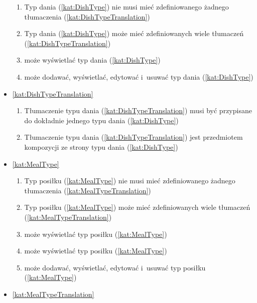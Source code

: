 \begin{itemize}[label={\textbf{Reguły dla}}, wide, labelwidth=!, labelindent=0pt]
\begin{enumerate}[label={\textbf{REG/\protect\threedigits{\arabic{enumi}}}}, wide, labelwidth=!, align=left, leftmargin=3cm, resume]
        \item Typ dania (\ref{kat:DishType}) nie musi mieć zdefiniowanego żadnego tłumaczenia (\ref{kat:DishTypeTranslation})
        \item Typ dania (\ref{kat:DishType}) może mieć zdefiniowanych wiele tłumaczeń (\ref{kat:DishTypeTranslation})
        \item {} może wyświetlać typ dania (\ref{kat:DishType})
        \item {} może dodawać, wyświetlać, edytować i~usuwać typ dania (\ref{kat:DishType})
    \end{enumerate}
    \item\ref{kat:DishTypeTranslation}
    \begin{enumerate}[label={\textbf{REG/\protect\threedigits{\arabic{enumi}}}}, wide, labelwidth=!, align=left, leftmargin=3cm, resume]
        \item Tłumaczenie typu dania (\ref{kat:DishTypeTranslation}) musi być przypisane do dokładnie jednego typu dania (\ref{kat:DishType})
        \item Tłumaczenie typu dania (\ref{kat:DishTypeTranslation}) jest przedmiotem kompozycji ze strony typu dania (\ref{kat:DishType})
    \end{enumerate}
    \item\ref{kat:MealType}
    \begin{enumerate}[label={\textbf{REG/\protect\threedigits{\arabic{enumi}}}}, wide, labelwidth=!, align=left, leftmargin=3cm, resume]
        \item Typ posiłku (\ref{kat:MealType}) nie musi mieć zdefiniowanego żadnego tłumaczenia (\ref{kat:MealTypeTranslation})
        \item Typ posiłku (\ref{kat:MealType}) może mieć zdefiniowanych wiele tłumaczeń (\ref{kat:MealTypeTranslation})
        \item {} może wyświetlać typ posiłku (\ref{kat:MealType})
        \item {} może wyświetlać typ posiłku (\ref{kat:MealType})
        \item {} może dodawać, wyświetlać, edytować i~usuwać typ posiłku (\ref{kat:MealType})
    \end{enumerate}
    \item\ref{kat:MealTypeTranslation}
    \begin{enumerate}[label={\textbf{REG/\protect\threedigits{\arabic{enumi}}}}, wide, labelwidth=!, align=left, leftmargin=3cm, resume]

\end{enumerate}
\end{itemize}
